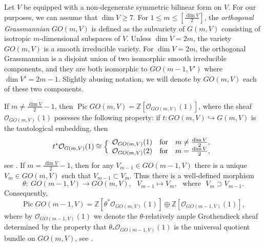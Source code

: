 \documentclass[12pt]{amsart}
\newcommand{\Pic}{\operatorname{Pic}\nolimits}
\theoremstyle{definition}
\begin{document}
\vspace{4mm}

Let $V$ be equipped with a non-degenerate symmetric bilinear 
form on $V$. For our purposes, we can assume that $\dim 
V\ge7$. For $1\le m\le[\frac{\dim V}{2}]$, the 
\textit{orthogonal Grassmannian} $GO(m,V)$ is defined as the
subvariety of $G(m,V)$ consisting of isotropic 
$m$-dimensional subspaces of $V$. Unless $\dim V=2m$, 
the variety $GO(m,V)$ is a smooth irreducible variety. For 
$\dim V=2m$, the orthogonal Grassmannian is a disjoint 
union of two isomorphic smooth irreducible components, and 
they are both isomorphic to $GO(m-1,V')$ where $\dim V'=2m-1$. 
Slightly abusing notation, we will denote by $GO(m,V)$ each of 
these two components. 

If $m\ne\frac{\dim V}{2}-1$, then $\Pic GO(m,V)=\mathbb{Z}
[\mathcal{O}_{GO(m,V)}(1)]$, where the sheaf $\mathcal{O}_{GO
(m,V)}(1)$ posesses the following property: if $t: GO(m,V)
\hookrightarrow G(m,V)$ is the tautological embedding, then
\begin{equation*}\label{restrictn Pic}
t^*\mathcal{O}_{G(m,V)}(1)\cong\Bigl\{
\begin{array}{lll}
\mathcal{O}_{GO(m,V)}(1) & \mathrm{for} & 
m\ne\frac{\dim V}{2},\\
\mathcal{O}_{GO(m,V)}(2) &  \mathrm{for} & 
m=\frac{\dim V}{2},
\end{array}
\end{equation*}
see \cite[(1.7)]{LV}. If $m=\frac{\dim V}{2}-1$, then for any 
$V_{m-1}\in GO(m-1,V)$ there is a unique $V_m\in GO(m,V)$ such that 
$V_{m-1}\subset V_m$. Thus there is a well-defined morphism
\begin{equation}\label{flag ortho n-1,n}
\theta:\ GO(m-1,V)\to GO(m,V),\ \ \ V_{m-1}\mapsto V_m,
\ \ \ \textrm{where}\ \ \ V_m\supset V_{m-1}. 
\end{equation}
Consequently,
\begin{equation*}\label{Pic GO special}
\Pic GO(m-1,V)=\mathbb{Z}[\theta^*\mathcal{O}_{GO(m,V)}(1)]
\oplus\mathbb{Z}[\mathcal{O}_{GO(m-1,V)}(1)],
\end{equation*}
where by $\mathcal{O}_{GO(m-1,V)}(1)$ we denote the 
$\theta$-relatively ample Grothendieck sheaf determined by the 
property that $\theta_*\mathcal{O}_{GO(m-1,V)}(1)$ is the 
universal quotient bundle on $GO(m,V)$, see \cite[Ch. II, Ex. 7.9(a)]{H}.


\vspace{2mm}
\end{document}
